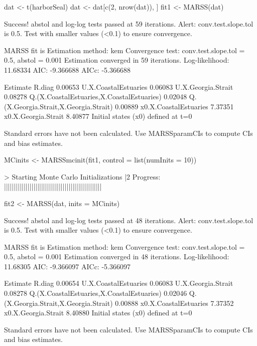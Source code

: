\begin{Schunk}
\begin{Sinput}
 dat <- t(harborSeal)
 dat <- dat[c(2, nrow(dat)), ]
 fit1 <- MARSS(dat)
\end{Sinput}
\begin{Soutput}
Success! abstol and log-log tests passed at 59 iterations.
Alert: conv.test.slope.tol is 0.5.
Test with smaller values (<0.1) to ensure convergence.

MARSS fit is
Estimation method: kem 
Convergence test: conv.test.slope.tol = 0.5, abstol = 0.001
Estimation converged in 59 iterations. 
Log-likelihood: 11.68334 
AIC: -9.366688   AICc: -5.366688   
 
                                          Estimate
R.diag                                     0.00653
U.X.CoastalEstuaries                       0.06083
U.X.Georgia.Strait                         0.08278
Q.(X.CoastalEstuaries,X.CoastalEstuaries)  0.02048
Q.(X.Georgia.Strait,X.Georgia.Strait)      0.00889
x0.X.CoastalEstuaries                      7.37351
x0.X.Georgia.Strait                        8.40877
Initial states (x0) defined at t=0

Standard errors have not been calculated. 
Use MARSSparamCIs to compute CIs and bias estimates.
\end{Soutput}
\begin{Sinput}
 MCinits <- MARSSmcinit(fit1, control = list(numInits = 10))
\end{Sinput}
\begin{Soutput}
> Starting Monte Carlo Initializations
          |2%      |20%      |40%      |60%      |80%      |100%
Progress: ||||||||||||||||||||||||||||||||||||||||||||||||||
\end{Soutput}
\begin{Sinput}
 fit2 <- MARSS(dat, inits = MCinits)
\end{Sinput}
\begin{Soutput}
Success! abstol and log-log tests passed at 48 iterations.
Alert: conv.test.slope.tol is 0.5.
Test with smaller values (<0.1) to ensure convergence.

MARSS fit is
Estimation method: kem 
Convergence test: conv.test.slope.tol = 0.5, abstol = 0.001
Estimation converged in 48 iterations. 
Log-likelihood: 11.68305 
AIC: -9.366097   AICc: -5.366097   
 
                                          Estimate
R.diag                                     0.00654
U.X.CoastalEstuaries                       0.06083
U.X.Georgia.Strait                         0.08278
Q.(X.CoastalEstuaries,X.CoastalEstuaries)  0.02046
Q.(X.Georgia.Strait,X.Georgia.Strait)      0.00888
x0.X.CoastalEstuaries                      7.37352
x0.X.Georgia.Strait                        8.40880
Initial states (x0) defined at t=0

Standard errors have not been calculated. 
Use MARSSparamCIs to compute CIs and bias estimates.
\end{Soutput}
\end{Schunk}
